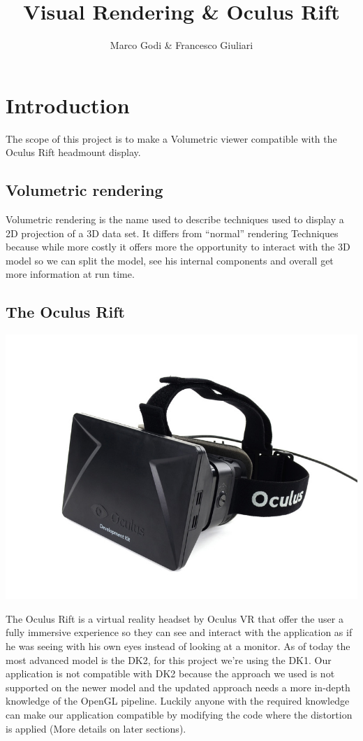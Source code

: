 \documentclass[11pt]{article} %
\title{Visual Rendering \& Oculus Rift}
\author{Marco Godi \& Francesco Giuliari}
\begin{document}
\maketitle


\tableofcontents





\newpage
\section {Introduction}
The scope of this project is to make a Volumetric viewer compatible with the Oculus Rift headmount display.

\subsection{Volumetric rendering}
Volumetric rendering is the name used to describe techniques used to display a 2D projection of a 3D data set. It differs from ``normal'' rendering Techniques because while more costly it offers more the opportunity to interact with the 3D model so we can split the model, see his internal components and overall get more information at run time.  

\subsection{The Oculus Rift}
\includegraphics[scale=0.5]{oculus.jpg}

The Oculus Rift  is a virtual reality headset by Oculus VR that offer the user a fully immersive experience so they can see and interact with the application as if he was seeing with his own eyes instead of looking at a monitor. As of today the most advanced model is the DK2, for this project we're using the DK1. Our application is not compatible with DK2 because the approach we used is not supported on the newer model and the updated approach needs a more in-depth knowledge of the OpenGL pipeline. Luckily anyone with the required knowledge can make our application compatible by modifying the code where the distortion is applied (More details on later sections).
\end{document}
